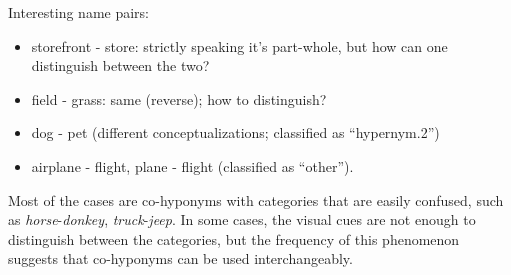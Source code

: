 Interesting name pairs:

\begin{itemize}
\item storefront - store: strictly speaking it's part-whole, but how can one distinguish between the two? 
\item field - grass: same (reverse); how to distinguish?
\item dog - pet (different conceptualizations; classified as ``hypernym.2'')
\item airplane - flight, plane - flight (classified as ``other'').
\end{itemize}


Most of the cases are co-hyponyms with categories that are easily confused, such as \textit{horse}-\textit{donkey}, \textit{truck}-\textit{jeep}.
In some cases, the visual cues are not enough to distinguish between the categories, but the frequency of this phenomenon suggests that co-hyponyms can be used interchangeably.

